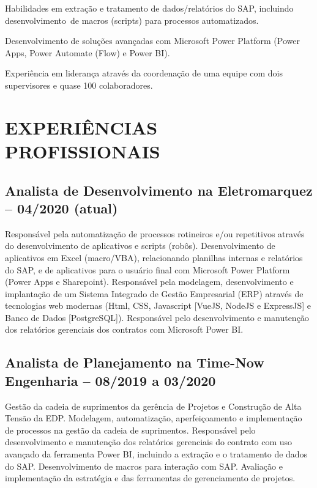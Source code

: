 \documentclass[]{article}
\begin{document}
Habilidades em extração e tratamento de dados/relatórios do SAP,
incluindo desenvolvimento~de macros (scripts) para processos
automatizados.

Desenvolvimento de soluções avançadas com Microsoft Power Platform
(Power Apps, Power Automate (Flow) e Power BI).

Experiência em liderança através da coordenação de uma equipe com dois
supervisores e quase 100 colaboradores.

\section{EXPERIÊNCIAS
PROFISSIONAIS}\label{experiuxeancias-profissionais}

\subsection{Analista de Desenvolvimento na Eletromarquez -- 04/2020
(atual)}\label{analista-de-desenvolvimento-na-eletromarquez-042020-atual}

Responsável pela automatização de processos rotineiros e/ou repetitivos
através do desenvolvimento de aplicativos e scripts (robôs).
Desenvolvimento de aplicativos em Excel (macro/VBA), relacionando
planilhas internas e relatórios do SAP, e de aplicativos para o usuário
final com Microsoft Power Platform (Power Apps e Sharepoint).
Responsável pela modelagem, desenvolvimento e implantação de um Sistema
Integrado de Gestão Empresarial (ERP) através de tecnologias web
modernas (Html, CSS, Javascript {[}VueJS, NodeJS e ExpressJS{]} e Banco
de Dados {[}PostgreSQL{]}). Responsável pelo desenvolvimento e
manutenção dos relatórios gerenciais dos contratos com Microsoft Power
BI.

\subsection{Analista de Planejamento na Time-Now Engenharia -- 08/2019 a
03/2020}\label{analista-de-planejamento-na-time-now-engenharia-082019-a-032020}

Gestão da cadeia de suprimentos da gerência de Projetos e Construção de
Alta Tensão da EDP. Modelagem, automatização, aperfeiçoamento e
implementação de processos na gestão da cadeia de suprimentos.
Responsável pelo desenvolvimento e manutenção dos relatórios gerenciais
do contrato com uso avançado da ferramenta Power BI, incluindo a
extração e o tratamento de dados do SAP. Desenvolvimento de macros para
interação com SAP. Avaliação e implementação da estratégia e das
ferramentas de gerenciamento de projetos.
\end{document}
